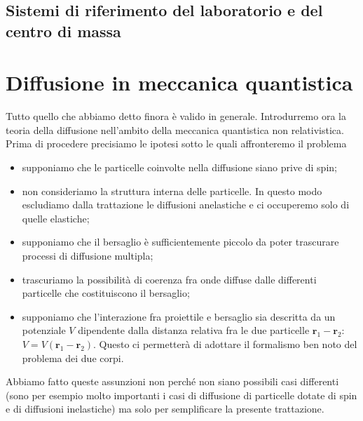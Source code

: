 \documentclass[a4paper,fleqn,twoside,12pt]{article}
\begin{document}
\subsection{Sistemi di riferimento del laboratorio e del centro di massa}
\label{sec:sistemi-riferimento}

\section{Diffusione in meccanica quantistica}
\label{sec:meccanica-quantistica}

Tutto quello che abbiamo detto finora è valido in generale.  Introdurremo ora la
teoria della diffusione nell'ambito della meccanica quantistica non
relativistica.  Prima di procedere precisiamo le ipotesi sotto le quali
affronteremo il problema
\begin{itemize}
\item supponiamo che le particelle coinvolte nella diffusione siano prive di
  spin;
\item non consideriamo la struttura interna delle particelle.  In questo modo
  escludiamo dalla trattazione le diffusioni anelastiche e ci occuperemo solo di
  quelle elastiche;
\item supponiamo che il bersaglio è sufficientemente piccolo da poter trascurare
  processi di diffusione multipla;
\item trascuriamo la possibilità di coerenza fra onde diffuse dalle differenti
  particelle che costituiscono il bersaglio;
\item supponiamo che l'interazione fra proiettile e bersaglio sia descritta da
  un potenziale $V$ dipendente dalla distanza relativa fra le due particelle
  $\bm{r}_{1} - \bm{r}_{2}$: $V = V(\bm{r}_{1} - \bm{r}_{2})$.  Questo ci
  permetterà di adottare il formalismo ben noto del problema dei due corpi.
\end{itemize}
Abbiamo fatto queste assunzioni non perché non siano possibili casi differenti
(sono per esempio molto importanti i casi di diffusione di particelle dotate di
spin e di diffusioni inelastiche) ma solo per semplificare la presente
trattazione.
\end{document}
